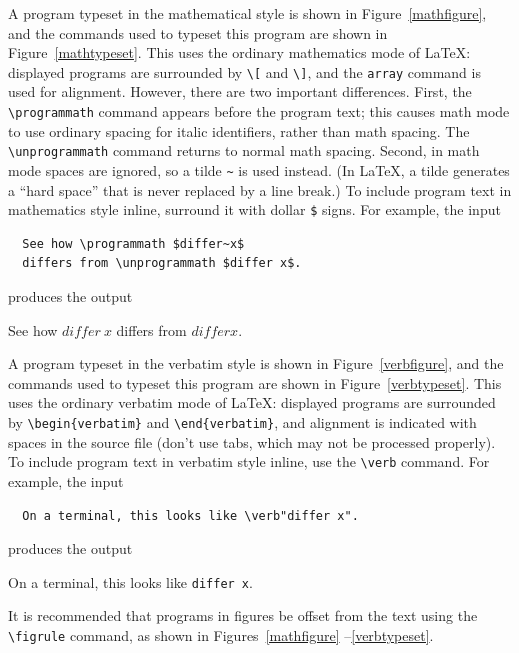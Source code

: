 \documentclass{article}
\begin{document}
A program typeset in the mathematical style is shown in
Figure~\ref{mathfigure}, and the commands used to typeset this program
are shown in Figure~\ref{mathtypeset}.  This uses the ordinary
mathematics mode of \LaTeX: displayed programs are surrounded by
\verb|\[| and \verb|\]|, and the \verb|array| command is used for
alignment.  However, there are two important differences.  First, the
\verb|\programmath| command appears before the program text; this
causes math mode to use ordinary spacing for italic identifiers,
rather than math spacing.  The \verb|\unprogrammath| command returns
to normal math spacing.  Second, in math mode spaces are ignored, so a
tilde \verb|~| is used instead.  (In \LaTeX, a tilde generates a
``hard space'' that is never replaced by a line break.)  To include
program text in mathematics style inline, surround it with dollar
\verb|$| signs.  For example, the input
\begin{verbatim}
  See how \programmath $differ~x$
  differs from \unprogrammath $differ x$.
\end{verbatim}
produces the output
\begin{center}
  See how \programmath $differ~x$
  differs from \unprogrammath $differ x$.
\end{center}

A program typeset in the verbatim style is shown in
Figure~\ref{verbfigure}, and the commands used to typeset this program
are shown in Figure~\ref{verbtypeset}.  This uses the ordinary
verbatim mode of \LaTeX: displayed programs are surrounded by
\verb|\begin{verbatim}| and \verb|\end{verbatim}|, and alignment is
indicated with spaces in the source file (don't use tabs, which may
not be processed properly).  To include program
text in verbatim style inline, use the \verb|\verb| command.
For example, the input
\begin{center}
\begin{verbatim}
  On a terminal, this looks like \verb"differ x".
\end{verbatim}
\end{center}
produces the output
\begin{center}
  On a terminal, this looks like \verb"differ x".
\end{center}

It is recommended that programs in figures be offset from the text
using the \verb|\figrule| command, as shown in Figures~\ref{mathfigure}%
--\ref{verbtypeset}.
\end{document}

